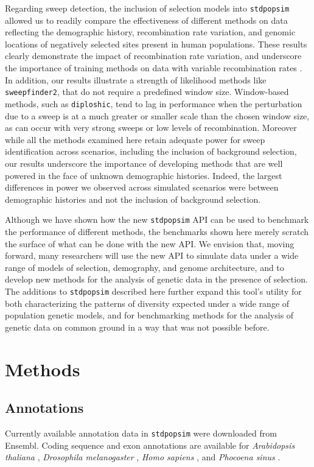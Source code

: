 \documentclass[hidelinks]{article}
\newcommand{\stdpopsim}{\texttt{stdpopsim}\xspace}
\newcommand{\sweepfinder}{\texttt{sweepfinder2}\xspace}
\newcommand{\diploshic}{\texttt{diploshic}\xspace}
\begin{document}
    Regarding sweep detection, the inclusion of selection models into \stdpopsim allowed us to readily compare the
    effectiveness of different methods on data reflecting the demographic history, recombination rate variation,
    and genomic locations of negatively selected sites present in human populations. These results clearly demonstrate
    the impact of recombination rate variation, and underscore the importance of training methods on data with variable
    recombination rates \citep[e.g.,][]{schrider2017soft}. In addition, our results
    illustrate a strength of likelihood methods like \sweepfinder, that do not require a predefined window size.
    Window-based methods, such as \diploshic, tend to lag in performance when the perturbation due to a sweep is at 
    a much greater or smaller scale than the chosen window size, as can occur with very strong sweeps or low levels of 
    recombination. Moreover while all the methods examined here retain adequate power for sweep identification across
    scenarios, including the inclusion of background selection, our results underscore the importance of developing 
    methods that are well powered in the face of unknown demographic histories. Indeed, the largest differences
    in power we observed across simulated scenarios were between demographic histories and not the inclusion of background
    selection. 

    Although we have shown how the new \stdpopsim API can be used to benchmark the performance of different methods,
    the benchmarks shown here merely scratch the surface of what can be done with the new API.
    We envision that, moving forward, many researchers will use
    the new API to simulate data under a wide range of models of selection, demography, and genome architecture, and to develop
    new methods for the analysis of genetic data in the presence of selection. 
    The additions to \stdpopsim described here further expand this tool's utility for both 
    characterizing the patterns of diversity expected under a wide range of population genetic
    models, and for benchmarking methods for the analysis of genetic data
    on common ground in a way that was not possible before.

\section*{Methods}
    \label{methods}

    \subsection*{Annotations}
    Currently available annotation data in \stdpopsim were downloaded from Ensembl.
    Coding sequence and exon annotations are available for
    \textit{Arabidopsis thaliana} \citep{cheng2017araport},
    \textit{Drosophila melanogaster} \citep{hoskins2015release},
    \textit{Homo sapiens} \citep{hunt2018ensembl},
    and \textit{Phocoena sinus} \citep[vaquita porpoise,][]{morin2021}.
\end{document}
